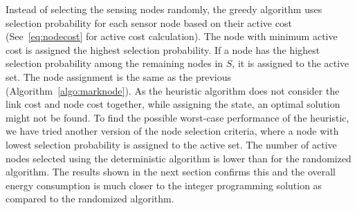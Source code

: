 \documentclass[conference]{IEEEtran}
\begin{document}
Instead of selecting the sensing nodes randomly, the greedy algorithm uses selection probability for each sensor node based on their active cost (See~\ref{eq:nodecost} for active cost calculation). The node with minimum active cost is assigned the highest selection probability. If a node has the highest selection probability among the remaining nodes in $S$, it is assigned to the active set. The node assignment is the same as the previous (Algorithm~\ref{algo:marknode}). As the heuristic algorithm does not consider the link cost and node cost together, while assigning the state, an optimal solution might not be found. To find the possible worst-case performance of the heuristic, we have tried another version of the node selection criteria, where a node with lowest selection probability is assigned to the active set. The number of active nodes selected using the deterministic algorithm is lower than for the randomized algorithm. The results shown in the next section confirms this and the overall energy consumption is much closer to the integer programming solution as compared to the randomized algorithm.
\end{document}
